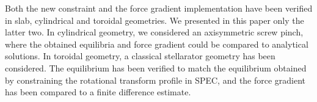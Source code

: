  Both the new constraint and the force gradient implementation have been verified in slab, cylindrical and toroidal geometries. We presented in this paper only the latter two. In cylindrical geometry, we considered an axisymmetric screw pinch, where the obtained equilibria and force gradient could be compared to analytical solutions. In toroidal geometry, a classical stellarator geometry has been considered. The equilibrium has been verified to match the equilibrium obtained by constraining the rotational transform profile in \ac{SPEC}, and the force gradient has been compared to a finite difference estimate. 
% 
 
% 
% 
%
%





